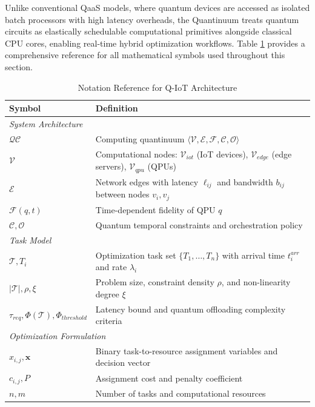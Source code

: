\documentclass[lettersize,journal]{IEEEtran}
\begin{document}
Unlike conventional QaaS models, where quantum devices are accessed as isolated batch processors with high latency overheads, the Quantinuum treats quantum circuits as elastically schedulable computational primitives alongside classical CPU cores, enabling real-time hybrid optimization workflows. Table \ref{tab:notations} provides a comprehensive reference for all mathematical symbols used throughout this section.
\begin{table}[t]
\caption{Notation Reference for Q-IoT Architecture}
\label{tab:notations}
\centering
\scriptsize
\begin{tabular}{p{3.2cm}p{5cm}}
\hline
\textbf{Symbol} & \textbf{Definition} \\ \hline

\multicolumn{2}{l}{\textit{System Architecture}} \\
$\mathcal{QC}$ &
Computing quantinuum $\langle \mathcal{V}, \mathcal{E}, \mathcal{F}, \mathcal{C}, \mathcal{O} \rangle$ \\
$\mathcal{V}$ &
Computational nodes: $\mathcal{V}_{iot}$ (IoT devices), $\mathcal{V}_{edge}$ (edge servers), $\mathcal{V}_{qpu}$ (QPUs) \\
$\mathcal{E}$ &
Network edges with latency $\ell_{ij}$ and bandwidth $b_{ij}$ between nodes $v_i,v_j$ \\
$\mathcal{F}(q,t)$ &
Time-dependent fidelity of QPU $q$ \\
$\mathcal{C},\mathcal{O}$ &
Quantum temporal constraints and orchestration policy \\

\hline
\multicolumn{2}{l}{\textit{Task Model}} \\
$\mathcal{T}, T_i$ &
Optimization task set $\{T_1,\dots,T_n\}$ with arrival time $t_i^{arr}$ and rate $\lambda_i$ \\
$|\mathcal{T}|,\rho,\xi$ &
Problem size, constraint density $\rho$, and non-linearity degree $\xi$ \\
$\tau_{req},\Phi(\mathcal{T}),\Phi_{threshold}$ &
Latency bound and quantum offloading complexity criteria \\

\hline
\multicolumn{2}{l}{\textit{Optimization Formulation}} \\
$x_{i,j},\mathbf{x}$ &
Binary task-to-resource assignment variables and decision vector \\
$c_{i,j},P$ &
Assignment cost and penalty coefficient \\
$n,m$ &
Number of tasks and computational resources \\


\end{tabular}
\end{table}
\end{document}
